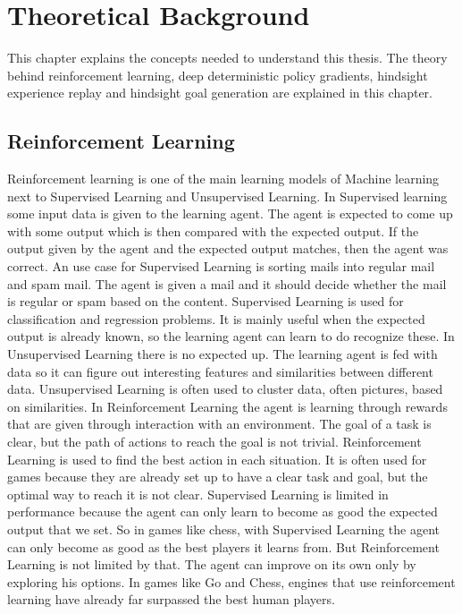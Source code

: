 \chapter{Theoretical Background}

This chapter explains the concepts needed to understand this thesis. The theory behind reinforcement learning, deep deterministic policy gradients, hindsight experience replay and hindsight goal generation are explained in this chapter. 


\section{Reinforcement Learning}


Reinforcement learning is one of the main learning models of Machine learning next to Supervised Learning and Unsupervised Learning. 
In Supervised learning some input data is given to the learning agent. The agent is expected to come up with some output which is then compared with the expected output. If the output given by the agent and the expected output matches, then the agent was correct. An use case for Supervised Learning is sorting mails into regular mail and spam mail. The agent is given a mail and it should decide whether the mail is regular or spam based on the content. Supervised Learning is used for classification and regression problems. It is mainly useful when the expected output is already known, so the learning agent can learn to do recognize these. 
In Unsupervised Learning there is no expected up. The learning agent is fed with data so it can figure out interesting features and similarities between different data. Unsupervised Learning is often used to cluster data, often pictures, based on similarities.
In Reinforcement Learning the agent is learning through rewards that are given through interaction with an environment. The goal of a task is clear, but the path of actions to reach the goal is not trivial. Reinforcement Learning is used to find the best action in each situation. It is often used for games because they are already set up to have a clear task and goal, but the optimal way to reach it is not clear. Supervised Learning is limited in performance because the agent can only learn to become as good the expected output that we set. So in games like chess, with Supervised Learning the agent can only become as good as the best players it learns from. But Reinforcement Learning is not limited by that. The agent can improve on its own only by exploring his options. In games like Go and Chess, engines that use reinforcement learning have already far surpassed the best human players. 

